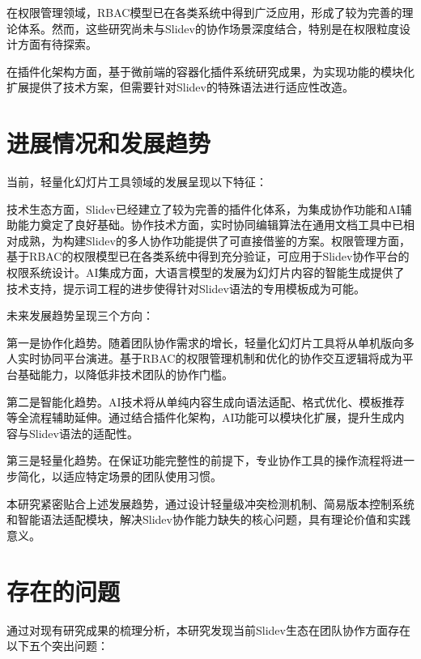 在权限管理领域，RBAC模型已在各类系统中得到广泛应用，形成了较为完善的理论体系。然而，这些研究尚未与Slidev的协作场景深度结合，特别是在权限粒度设计方面有待探索。

在插件化架构方面，基于微前端的容器化插件系统研究成果，为实现功能的模块化扩展提供了技术方案，但需要针对Slidev的特殊语法进行适应性改造。

\section{进展情况和发展趋势}
当前，轻量化幻灯片工具领域的发展呈现以下特征：

技术生态方面，Slidev已经建立了较为完善的插件化体系，为集成协作功能和AI辅助能力奠定了良好基础。协作技术方面，实时协同编辑算法在通用文档工具中已相对成熟，为构建Slidev的多人协作功能提供了可直接借鉴的方案。权限管理方面，基于RBAC的权限模型已在各类系统中得到充分验证，可应用于Slidev协作平台的权限系统设计。AI集成方面，大语言模型的发展为幻灯片内容的智能生成提供了技术支持，提示词工程的进步使得针对Slidev语法的专用模板成为可能。

未来发展趋势呈现三个方向：

第一是协作化趋势。随着团队协作需求的增长，轻量化幻灯片工具将从单机版向多人实时协同平台演进。基于RBAC的权限管理机制和优化的协作交互逻辑将成为平台基础能力，以降低非技术团队的协作门槛。

第二是智能化趋势。AI技术将从单纯内容生成向语法适配、格式优化、模板推荐等全流程辅助延伸。通过结合插件化架构，AI功能可以模块化扩展，提升生成内容与Slidev语法的适配性。

第三是轻量化趋势。在保证功能完整性的前提下，专业协作工具的操作流程将进一步简化，以适应特定场景的团队使用习惯。

本研究紧密贴合上述发展趋势，通过设计轻量级冲突检测机制、简易版本控制系统和智能语法适配模块，解决Slidev协作能力缺失的核心问题，具有理论价值和实践意义。

\section{存在的问题}
通过对现有研究成果的梳理分析，本研究发现当前Slidev生态在团队协作方面存在以下五个突出问题：

